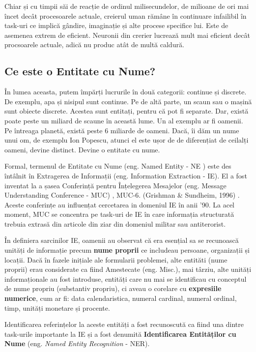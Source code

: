 Chiar și cu timpii săi de reacție de ordinul milisecundelor, de milioane de ori mai încet decât procesoarele actuale, creierul uman rămâne în continuare infailibil în task-uri ce implică gândire, imaginație și alte procese specifice lui. Este de asemenea extrem de eficient. Neuronii din crerier lucrează mult mai eficient decât procsoarele actuale, adică nu produc atât de multă caldură.

\subsection{Ce este o Entitate cu Nume?}

În lumea aceasta, putem împărți lucrurile în două categorii: continue și discrete. De exemplu, apa și nisipul sunt continue. Pe de altă parte, un scaun sau o mașină sunt obiecte discrete. Acestea sunt entitați, pentru că pot fi separate. Dar, există poate peste un miliard de scaune în această lume. Un al exemplu ar fi oamenii. Pe întreaga planetă, există peste 6 miliarde de oameni. Dacă, îi dăm un nume unui om, de exemplu Ion Popescu, atunci el este ușor de de diferențiat de ceilalți oameni, devine distinct. Devine o entitate cu nume.

 
Formal, termenul de Entitate cu Nume (eng. Named Entity - NE )  este des întâlnit în Extragerea de Informații (eng. Information Extraction - IE). El a fost inventat la a șasea Conferință pentru Înțelegerea Mesajelor (eng. Message Understanding Conference - MUC)
, MUC-6. (Grishman \& Sundheim, 1996) \cite{grishman1996}. Aceste conferințe au influențat cercetarea in domeniul IE în anii '90. La acel moment, MUC se concentra pe task-uri de IE în care informația structurată trebuia extrasă din articole din ziar din domeniul militar sau antiterorist.


În definiera sarcinilor IE, oamenii au observat că era esențial sa se recunoască unități de informație precum \textbf{nume proprii} ce includeau persoane, organizații și locații. Dacă în fazele inițiale ale formularii problemei, alte entităti (nume proprii) erau considerate ca fiind Amestecate (eng. Misc.), mai târziu, alte unități informaționale au fost introduse, entități care nu mai se identificau cu conceptul de nume propriu (substantiv propriu), ci aveau o corelare cu \textbf{expresiile numerice}, cum ar fi: data calendaristica, numeral cardinal, numeral ordinal, timp, unități monetare și procente.


Identificarea referințelor la aceste entități a fost recunoscută ca fiind una dintre task-urile importante la IE și a fost denumită \textbf{Identificarea Entităților cu Nume} (eng. \textit{Named Entity Recognition} - NER).


